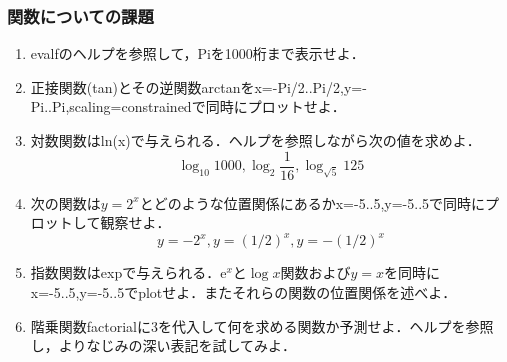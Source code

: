 \subsubsection{関数についての課題}
\begin{enumerate}
\item evalfのヘルプを参照して，Piを1000桁まで表示せよ．
\item 正接関数(tan)とその逆関数arctanをx=-Pi/2..Pi/2,y=-Pi..Pi,scaling=constrainedで同時にプロットせよ．
\item 対数関数はln(x)で与えられる．ヘルプを参照しながら次の値を求めよ．
\begin{equation*}
\log_{10}1000, \log_{2}\frac{1}{16}, \log_{\sqrt{5}}125
\end{equation*}
\item 次の関数は$y=2^x$とどのような位置関係にあるかx=-5..5,y=-5..5で同時にプロットして観察せよ．
\begin{equation*}
y = -2^x, y = (1/2)^x,y = -(1/2)^x
\end{equation*}
\item 指数関数はexpで与えられる．$\mbox{e}^x$と$\log x$関数および$y = x$を同時にx=-5..5,y=-5..5でplotせよ．またそれらの関数の位置関係を述べよ．
\item 階乗関数factorialに3を代入して何を求める関数か予測せよ．ヘルプを参照し，よりなじみの深い表記を試してみよ．
\end{enumerate}
